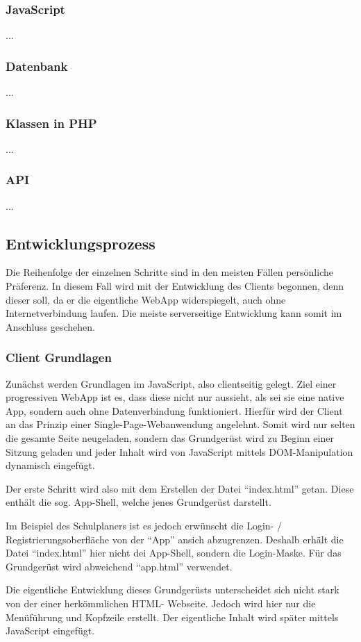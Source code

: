 \documentclass[a4paper,12pt,ngerman]{scrartcl}      %
\let\oldcite\cite
\renewcommand{\cite}[1]{\textsuperscript{\oldcite{#1}}}
\newcommand{\spacer}{\par\bigskip\noindent}
\begin{document}
	\subsubsection{JavaScript}
	...
	\subsubsection{Datenbank}
	...
	\subsubsection{Klassen in PHP}
	...
	\subsubsection{API}
	...
	\subsection{Entwicklungsprozess}
	Die Reihenfolge der einzelnen Schritte sind in den meisten Fällen persönliche Präferenz. In diesem Fall wird mit der Entwicklung des Clients begonnen, denn dieser soll, da er die eigentliche WebApp widerspiegelt, auch ohne Internetverbindung laufen. Die meiste serverseitige Entwicklung kann somit im Anschluss geschehen.\par
	
	\subsubsection{Client Grundlagen}
	Zunächst werden Grundlagen im JavaScript, also clientseitig gelegt. Ziel einer progressiven WebApp ist es, dass diese nicht nur aussieht, als sei sie eine native App, sondern auch ohne Datenverbindung funktioniert. Hierfür wird der Client an das Prinzip einer Single-Page-Webanwendung\cite{singlePageWiki} angelehnt. Somit wird nur selten die gesamte Seite neugeladen, sondern das Grundgerüst wird zu Beginn einer Sitzung geladen und jeder Inhalt wird von JavaScript mittels DOM-Manipulation dynamisch eingefügt.\par
	Der erste Schritt wird also mit dem Erstellen der Datei ``index.html'' getan. Diese enthält die sog. App-Shell, welche jenes Grundgerüst darstellt.\par
	Im Beispiel des Schulplaners ist es jedoch erwünscht die Login- / Registrierungsoberfläche von der ``App'' ansich abzugrenzen. Deshalb erhält die Datei ``index.html'' hier nicht dei App-Shell, sondern die Login-Maske. Für das Grundgerüst wird abweichend ``app.html'' verwendet.\par
	\spacer Die eigentliche Entwicklung dieses Grundgerüsts unterscheidet sich nicht stark von der einer herkömmlichen HTML- Webseite. Jedoch wird hier nur die Me\-nü\-füh\-rung und Kopfzeile erstellt. Der eigentliche Inhalt wird später mittels JavaScript eingefügt.
	
\end{document}

